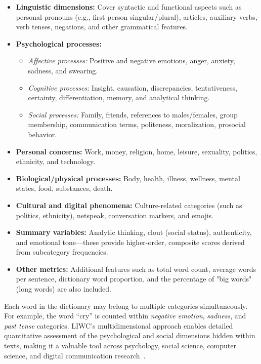 \begin{itemize}
    \item \textbf{Linguistic dimensions:} Cover syntactic and functional aspects such as personal pronouns (e.g., first person singular/plural), articles, auxiliary verbs, verb tenses, negations, and other grammatical features.
    \item \textbf{Psychological processes:}
        \begin{itemize}
            \item \textit{Affective processes:} Positive and negative emotions, anger, anxiety, sadness, and swearing.
            \item \textit{Cognitive processes:} Insight, causation, discrepancies, tentativeness, certainty, differentiation, memory, and analytical thinking.
            \item \textit{Social processes:} Family, friends, references to males/females, group membership, communication terms, politeness, moralization, prosocial behavior.
        \end{itemize}
    \item \textbf{Personal concerns:} Work, money, religion, home, leisure, sexuality, politics, ethnicity, and technology.
    \item \textbf{Biological/physical processes:} Body, health, illness, wellness, mental states, food, substances, death.
    \item \textbf{Cultural and digital phenomena:} Culture-related categories (such as politics, ethnicity), netspeak, conversation markers, and emojis.
    \item \textbf{Summary variables:} Analytic thinking, clout (social status), authenticity, and emotional tone---these provide higher-order, composite scores derived from subcategory frequencies.
    \item \textbf{Other metrics:} Additional features such as total word count, average words per sentence, dictionary word proportion, and the percentage of "big words" (long words) are also included.
\end{itemize}

Each word in the dictionary may belong to multiple categories simultaneously. For example, the word ``cry'' is counted within \textit{negative emotion}, \textit{sadness}, and \textit{past tense} categories. LIWC's multidimensional approach enables detailed quantitative assessment of the psychological and social dimensions hidden within texts, making it a valuable tool across psychology, social science, computer science, and digital communication research~\cite{pennebaker2022liwc}.



